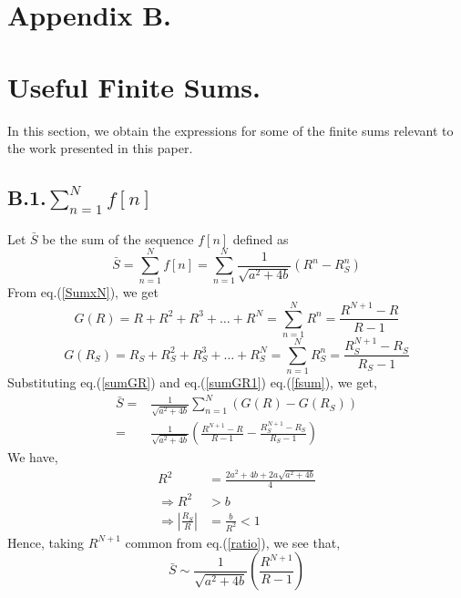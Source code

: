 \begin{multicols}{2}
\vspace{-.8cm}

\section*{Appendix B.}\label{app-b}
\section*{Useful Finite Sums.}
In this section, we obtain the expressions for some of the finite sums relevant to the work presented in this paper. 
\subsection*{B.1.$\displaystyle{\sum_{n=1}^Nf[n]}$}\label{sub-app-B-1}
Let $\bar{S}$ be the sum of the sequence $f[n]$ defined as
\begin{equation*}
\bar{S} =\displaystyle{\sum_{n=1}^N f[n]} = \displaystyle{\sum_{n=1}^N \frac{1}{\sqrt{a^2 + 4b}}(R^n - R_S^n)}\tag{B.1}\label{eq-B.1}
\end{equation*}
From eq.(\ref{SumxN}), we get
\begin{equation*}
G(R) = R + R^2 + R^3 + \ldots + R^N =\displaystyle{ \sum_{n=1}^N R^n = \frac{R^{N+1}- R}{R-1}}\tag{B.2}\label{eq-B.2}
\end{equation*}
\begin{equation*}
G(R_S) = R_S + R_S^2 + R_S^3 + \ldots + R_S^N = \displaystyle{\sum_{n=1}^N R_S^n = \frac{R_S^{N+1}- R_S}{R_S-1}}\tag{B.3}\label{eq-B.3}
\end{equation*}
Substituting eq.(\ref{sumGR}) and eq.(\ref{sumGR1}) eq.(\ref{fsum}), we get,
\begin{align*}
\bar{S} =& \displaystyle{\frac{1}{\sqrt{a^2 + 4b}}}\displaystyle{\sum_{n=1}^N{(G(R) -  G(R_S))}}\nonumber\\
  = & \displaystyle{\frac{1}{\sqrt{a^2 + 4b}}} \left(\displaystyle{\frac{R^{N+1}- R}{R-1}} - \displaystyle{\frac{R_S^{N+1}- R_S}{R_S-1}}\right)\tag{B.4}\label{eq-B.4}
\end{align*}
We have,
\begin{align*}
\nonumber R^2 &= \displaystyle{\frac{2a^2+4b+2a\sqrt{a^2+4b}}{4}}\\ 
\nonumber \Rightarrow R^2 &> b\\
\Rightarrow |\frac{R_S}{R}| &= \frac{b}{R^2} < 1  \tag{B.5}\label{eq-B.5}
\end{align*}
Hence, taking $R^{N+1}$ common from eq.(\ref{ratio}), we see that,
\begin{equation*}
 \bar{S} \sim \displaystyle{\frac{1}{\sqrt{a^2 + 4b}}}\left( \frac{R^{N+1}}{R-1}\right)\tag{B.6}\label{eq-B.6}
\end{equation*}


\end{multicols}
